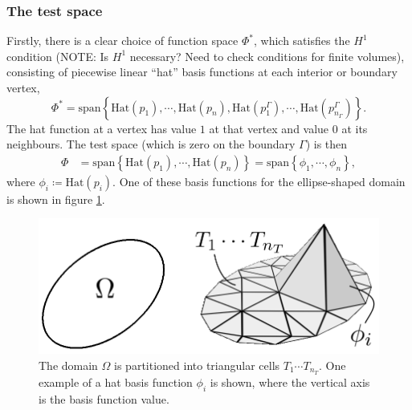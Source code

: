 \subsubsection{The test space}
Firstly, there is a clear choice of function space $\Phi^*$, which satisfies the $H^1$ condition
(NOTE: Is $H^1$ necessary? Need to check conditions for finite volumes), consisting of piecewise linear ``hat'' basis functions
at each interior or boundary vertex,
\newcommand{\hatfun}[1]{\text{Hat}(#1)}
$$
    \Phi^* = \text{span}\left\{
        \hatfun{p_1},\cdots,\hatfun{p_n},
        \hatfun{p^\Gamma_1},\cdots,\hatfun{p^\Gamma_{n_\Gamma}}
    \right\}.
$$
The hat function at a vertex has value $1$ at that vertex and value $0$ at its neighbours.
The test space (which is zero on the boundary $\Gamma$) is then
\begin{align*}
    \Phi &= \text{span}\left\{
        \hatfun{p_1},\cdots,\hatfun{p_n}
    \right\} = \text{span}\left\{\phi_1,\cdots,\phi_n\right\},
\end{align*}
where $\phi_i \coloneqq \text{Hat}(p_i)$.
One of these basis functions for the ellipse-shaped domain is shown in figure \ref{ellipse_partition}.
\begin{figure}[H]
    \begin{center}
        \includegraphics[width=0.53\linewidth]{figures/hat.png}
    \end{center}
    \caption{\scriptsize
        The domain $\Omega$ is partitioned into triangular cells $T_1\cdots T_{n_T}$. One example of a hat basis function $\phi_i$ is shown, where
        the vertical axis is the basis function value.
    }
    \label{ellipse_partition}
\end{figure}

\newpage
